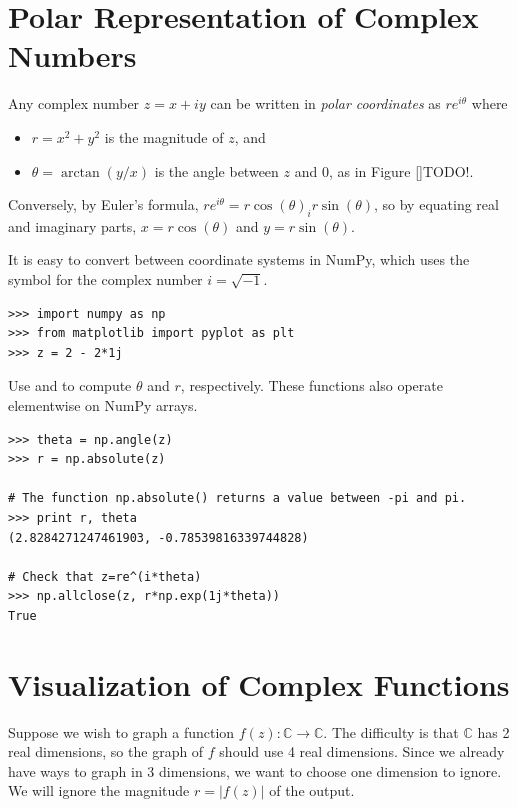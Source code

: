 \label{Lab:complex_intro}


\section*{Polar Representation of Complex Numbers}

Any complex number $z = x+iy$ can be written in \emph{polar coordinates} as $re^{i\theta}$ where
\begin{itemize}
\item $r=x^2+y^2$ is the magnitude of $z$, and
\item $\theta = \arctan(y/x)$ is the angle between $z$ and 0, as in Figure \ref{}TODO!.
\end{itemize}
Conversely, by Euler's formula, $re^{i\theta} = r\cos(\theta) _ ir\sin(\theta)$, so by equating real and imaginary parts, $x=r\cos(\theta)$ and $y=r\sin(\theta)$.

It is easy to convert between coordinate systems in NumPy, which uses the symbol  for the complex number $i=\sqrt{-1}$.
\begin{lstlisting}
>>> import numpy as np
>>> from matplotlib import pyplot as plt
>>> z = 2 - 2*1j
\end{lstlisting}
Use  and  to compute $\theta$ and $r$, respectively.
These functions also operate elementwise on NumPy arrays.
\begin{lstlisting}
>>> theta = np.angle(z)
>>> r = np.absolute(z)

# The function np.absolute() returns a value between -pi and pi.
>>> print r, theta
(2.8284271247461903, -0.78539816339744828)

# Check that z=re^(i*theta)
>>> np.allclose(z, r*np.exp(1j*theta))
True
\end{lstlisting}

\section*{Visualization of Complex Functions}
Suppose we wish to graph a function $f(z): \mathbb{C} \rightarrow \mathbb{C}$. 
The difficulty is that $\mathbb{C}$ has 2 real dimensions, so the graph of $f$ should use 4 real dimensions.
 Since we already have ways to graph in 3 dimensions, we want to choose one dimension to ignore. 
 We will ignore the magnitude $r = |f(z)|$ of the output.

